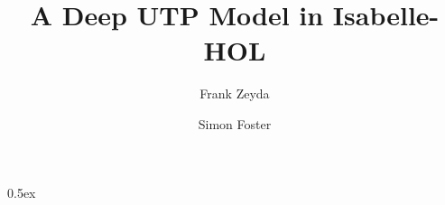\documentclass[11pt,a4paper]{article}
\begin{document}
\title{A Deep UTP Model in Isabelle-HOL}

\author{Frank Zeyda \and Simon Foster}

\maketitle

\tableofcontents

\parindent 0pt\parskip 0.5ex

%

\newpage



\newpage



\newpage



\newpage



\newpage



\newpage



\newpage



\newpage



\newpage



\newpage



\newpage



\newpage



\newpage



\newpage



\newpage



\newpage



\newpage



\newpage
\end{document}
